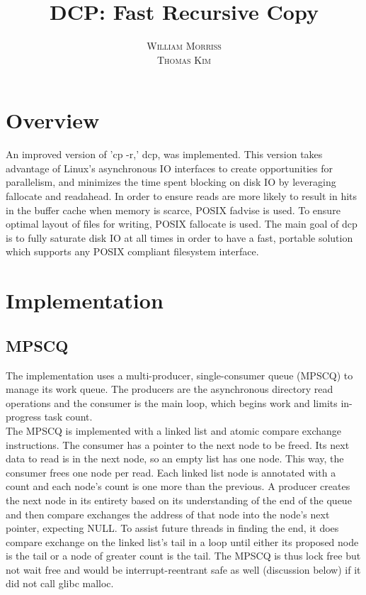 \documentclass[12pt]{article}
\title{\vspace{-25mm}\fontsize{16pt}{10pt}\selectfont\textbf{DCP: Fast Recursive Copy}} %
\author{
  \textsc{William Morriss} \\
  \textsc{Thomas Kim}
}
\date{}
\begin{document}
\maketitle %

\section{Overview}
An improved version of 'cp -r,' dcp, was implemented.
This version takes advantage of Linux's asynchronous IO interfaces to create
opportunities for parallelism, and minimizes the time spent blocking on disk
IO by leveraging fallocate and readahead. In order to ensure reads
are more likely to result in hits in the buffer cache when memory is scarce, POSIX
fadvise is used. To ensure optimal layout of files for writing, POSIX
fallocate is used. The main goal of dcp is to fully saturate disk IO
at all times in order to have a fast, portable solution which supports
any POSIX compliant filesystem interface. \\

\section{Implementation}

\subsection{MPSCQ}
The implementation uses a multi-producer, single-consumer queue (MPSCQ) to manage its
work queue. The producers are the asynchronous directory read operations and
the consumer is the main loop, which begins work and limits in-progress task
count. \\

The MPSCQ is implemented with a linked list and atomic compare exchange instructions.
The consumer has a pointer to the next node to be freed. Its next data to read
is in the next node, so an empty list has one node. This way, the consumer frees
one node per read. Each linked list node is annotated with a count and each
node's count is one more than the previous. A producer creates the next node in
its entirety based on its understanding of the end of the queue and then
compare exchanges the address of that node into the node's next pointer,
expecting NULL. To assist future threads in finding the end, it does compare
exchange on the linked list's tail in a loop until either its proposed node is
the tail or a node of greater count is the tail.
The MPSCQ is thus lock free but not wait free and would be interrupt-reentrant
safe as well (discussion below) if it did not call glibc malloc. \\
\end{document}
